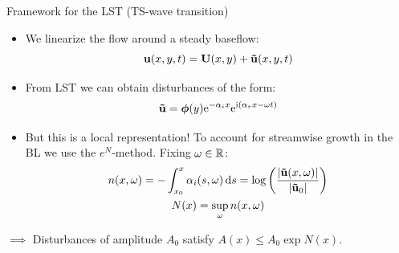 \documentclass[aspectratio=43, xcolor=table]{beamer}
\begin{document}
\begin{frame}{Framework for the LST (TS-wave transition)}


	\begin{itemize}
		\item We linearize the flow around a steady baseflow:
		      $$\boldsymbol{\mathrm{u}}(x,y,t) = \boldsymbol{\mathrm{U}}(x,y)+ \boldsymbol{\mathrm{\tilde{u}}}(x,y,t)$$
	\end{itemize}
	\pause
	\begin{itemize}
		\item From LST we can obtain disturbances of the form: $$\boldsymbol{\mathrm{\tilde{u}}} = \boldsymbol{\mathrm{\phi}}(y) \mathrm{e}^{ -\alpha_i x } \mathrm{e}^{ \mathrm{i} (\alpha_r x - \omega t) }$$
	\end{itemize}
	\pause
	\begin{itemize}
		\item But this is a local representation! To account for streamwise growth in the BL we use the $e^N$-method. Fixing $\omega\in \mathbb{R}$:
		      \begin{gather*}
			      n(x, \omega) = -\int_{x_0}^{x} \alpha_i(s,\omega)\dd{s} = \log\left( \frac{\abs{\boldsymbol{\mathrm{\tilde{u}}}(x,\omega)}}{\abs{\boldsymbol{\mathrm{\tilde{u}}}_0}} \right) \\
			      N(x) = \sup_{\omega} n(x, \omega)
		      \end{gather*}
	\end{itemize}\pause
	\begin{itemize}
		$\implies$ Disturbances of amplitude $A_0$ satisfy $A(x) \leq A_0 \exp{N(x)}$.
	\end{itemize}

\end{frame}
\end{document}

